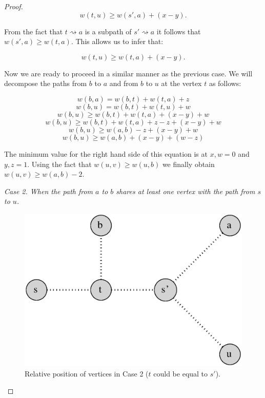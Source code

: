 \begin{proof}
$$ w(t, u) \ge w(s', a) + (x - y).$$

From the fact that $t \rightsquigarrow a$ is a subpath of $s' \rightsquigarrow a$ it follows that $w(s', a) \ge w(t, a)$. This allows us to infer that:

$$ w(t, u) \ge w(t, a) + (x - y). $$

Now we are ready to proceed in a similar manner as the previous case. We will decompose the paths from $b$ to $a$ and from $b$ to $u$ at the vertex $t$ as follows:

$$ w(b, a) = w(b, t) + w(t, a) + z  $$
$$ w(b, u) = w(b, t) + w(t, u) + w  $$
$$ w(b, u) \ge w(b, t) + w(t, a) + (x - y) + w $$
$$ w(b, u) \ge w(b, t) + w(t, a) + z - z + (x - y) + w $$
$$ w(b, u) \ge w(a, b) - z + (x - y) + w $$
$$ w(b, u) \ge w(a, b) + (x - y) + (w - z) $$

The minimum value for the right hand side of this equation is at $x, w = 0$ and $y, z = 1$. Using the fact that $w(u, v) \ge w(u, b)$ we finally obtain $ w(u, v) \ge w(a, b) - 2 $.


{\em Case 2. When the path from $a$ to $b$ shares at least one vertex with the path from $s$ to $u$.}

\begin{figure}%
    \centering
    \includegraphics[center, scale=0.5 ]{./images/2xbfs-case-2.eps}
    \caption{Relative position of vertices in Case 2 ($t$ could be equal to $s'$). }%
    \label{fig:case2}%
\end{figure}



\end{proof}
